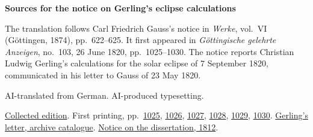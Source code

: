 \clearpage\thispagestyle{empty}
\begin{center}\Large\bfseries Sources for the notice on Gerling’s eclipse calculations\end{center}

The translation follows Carl Friedrich Gauss’s notice in \emph{Werke}, vol.~VI (Göttingen, 1874), pp.~622--625. It first appeared in \emph{Göttingische gelehrte Anzeigen}, no.~103, 26 June 1820, pp.~1025--1030. The notice reports Christian Ludwig Gerling’s calculations for the solar eclipse of 7 September 1820, communicated in his letter to Gauss of 23 May 1820.

AI-translated from German. AI-produced typesetting.

\href{https://gdz.sub.uni-goettingen.de/id/PPN236007467}{Collected edition}. First printing, pp.~\href{https://images.p.sub.uni-goettingen.de/iiif/image/gdz:PPN319721507_1820:00001021/full/1850,/0/default.jpg}{1025}, \href{https://images.p.sub.uni-goettingen.de/iiif/image/gdz:PPN319721507_1820:00001022/full/1850,/0/default.jpg}{1026}, \href{https://images.p.sub.uni-goettingen.de/iiif/image/gdz:PPN319721507_1820:00001023/full/1850,/0/default.jpg}{1027}, \href{https://images.p.sub.uni-goettingen.de/iiif/image/gdz:PPN319721507_1820:00001024/full/1850,/0/default.jpg}{1028}, \href{https://images.p.sub.uni-goettingen.de/iiif/image/gdz:PPN319721507_1820:00001025/full/1850,/0/default.jpg}{1029}, \href{https://images.p.sub.uni-goettingen.de/iiif/image/gdz:PPN319721507_1820:00001026/full/1850,/0/default.jpg}{1030}. \href{https://kalliope-verbund.info/de/ead?ead.id=DE-611-HS-3219295}{Gerling’s letter, archive catalogue}. \href{https://images.p.sub.uni-goettingen.de/iiif/image/gdz:PPN319721507_1812:00001933/full/1650,/0/default.jpg}{Notice on the dissertation, 1812}.

\clearpage
